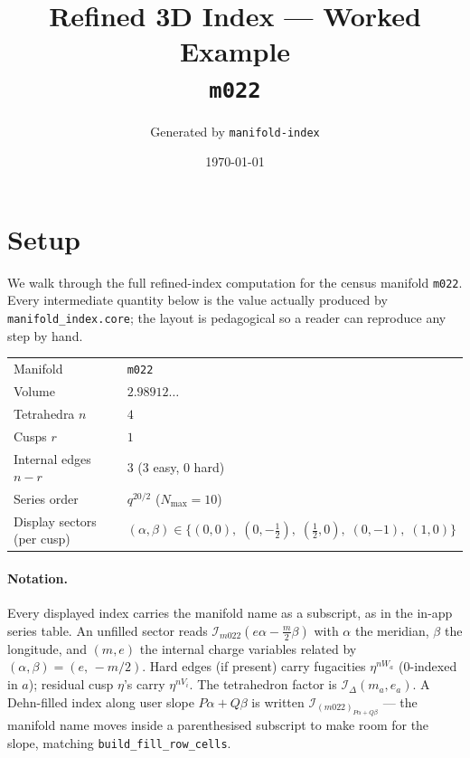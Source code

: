 \documentclass[11pt,a4paper]{article}
\title{Refined 3D Index --- Worked Example \\[2pt] \large \texttt{m022}}
\author{Generated by \texttt{manifold-index}}
\date{\today}
\renewcommand{\Im}{\mathcal{I}_{m022}}                %
\newcommand{\IDelta}{\mathcal{I}_{\Delta}}            %
\newcommand{\Ifill}[2]{\mathcal{I}_{(#1)_{#2}}}
\begin{document}
\maketitle
\tableofcontents
\bigskip

\section{Setup}

We walk through the full refined-index computation for the census
manifold \texttt{m022}.  Every intermediate quantity below is the value
actually produced by \texttt{manifold\_index.core}; the layout is
pedagogical so a reader can reproduce any step by hand.

\begin{center}
\begin{tabular}{l l}
\toprule
Manifold                        & \texttt{m022} \\
Volume                          & \(2.98912\ldots\) \\
Tetrahedra \(n\)                & \(4\) \\
Cusps \(r\)                     & \(1\) \\
Internal edges \(n-r\)          & \(3\) \;(\(3\) easy, \(0\) hard) \\
Series order                    & \(q^{20/2}\) \;(\(N_{\max}=10\)) \\
Display sectors (per cusp)      & \((\alpha,\beta) \in
   \bigl\{(0,0),\;(0,-\tfrac12),\;(\tfrac12,0),\;(0,-1),\;(1,0)\bigr\}\) \\
\bottomrule
\end{tabular}
\end{center}

\paragraph{Notation.}
Every displayed index carries the manifold name as a subscript, as in
the in-app series table.  An unfilled sector reads
\(\Im(e\alpha - \tfrac{m}{2}\beta)\) with \(\alpha\) the meridian,
\(\beta\) the longitude, and \((m,e)\) the internal charge variables
related by \((\alpha,\beta) = (e,\,-m/2)\).  Hard edges (if present)
carry fugacities \(\eta^{nW_a}\) (\(0\)-indexed in \(a\)); residual
cusp \(\eta\)'s carry \(\eta^{nV_i}\).  The tetrahedron factor is
\(\IDelta(m_a, e_a)\).  A Dehn-filled index along user slope
\(P\alpha+Q\beta\) is written
\(\Ifill{m022}{P\alpha+Q\beta}\) --- the manifold name moves
inside a parenthesised subscript to make room for the slope, matching
\texttt{build\_fill\_row\_cells}.
\end{document}
